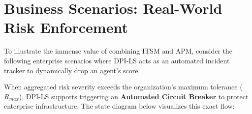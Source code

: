 \documentclass[11pt,a4paper]{article}
\begin{document}
\newpage

\section{Business Scenarios: Real-World Risk Enforcement}

To illustrate the immense value of combining ITSM and APM, consider the following enterprise scenarios where DPI-LS acts as an automated incident tracker to dynamically drop an agent's score.

When aggregated risk severity exceeds the organization's maximum tolerance ($R_{max}$), DPI-LS supports triggering an \textbf{Automated Circuit Breaker} to protect enterprise infrastructure. The state diagram below visualizes this exact flow:

\vspace{0.5cm}
\end{document}
